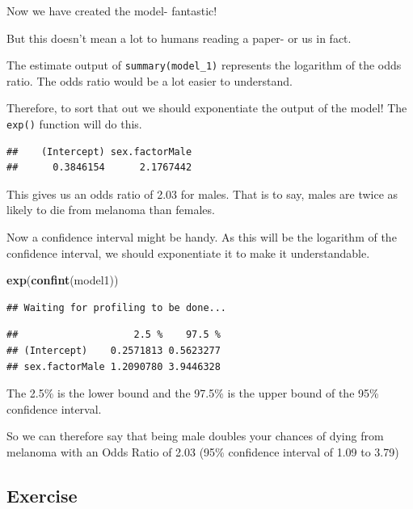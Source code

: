 \documentclass[]{book}
\makeatletter
\newenvironment{Shaded}{\begin{snugshade}}{\end{snugshade}}
\newcommand{\KeywordTok}[1]{\textcolor[rgb]{0.13,0.29,0.53}{\textbf{#1}}}
\newcommand{\OperatorTok}[1]{\textcolor[rgb]{0.81,0.36,0.00}{\textbf{#1}}}
\newcommand{\NormalTok}[1]{#1}
\newenvironment{kframe}{%
\medskip{}
\setlength{\fboxsep}{.8em}
 \def\at@end@of@kframe{}%
 \ifinner\ifhmode%
  \def\at@end@of@kframe{\end{minipage}}%
  \begin{minipage}{\columnwidth}%
 \fi\fi%
 \def\FrameCommand##1{\hskip\@totalleftmargin \hskip-\fboxsep
 \colorbox{shadecolor}{##1}\hskip-\fboxsep
     \hskip-\linewidth \hskip-\@totalleftmargin \hskip\columnwidth}%
 \MakeFramed {\advance\hsize-\width
   \@totalleftmargin\z@ \linewidth\hsize
   \@setminipage}}%
 {\par\unskip\endMakeFramed%
 \at@end@of@kframe}
\renewenvironment{Shaded}{\begin{kframe}}{\end{kframe}}
\makeatother
\begin{document}
Now we have created the model- fantastic!

But this doesn't mean a lot to humans reading a paper- or us in fact.

The estimate output of \texttt{summary(model\_1)} represents the
logarithm of the odds ratio. The odds ratio would be a lot easier to
understand.

Therefore, to sort that out we should exponentiate the output of the
model! The \texttt{exp()} function will do this.

\begin{Shaded}
\end{Shaded}

\begin{verbatim}
##    (Intercept) sex.factorMale 
##      0.3846154      2.1767442
\end{verbatim}

This gives us an odds ratio of 2.03 for males. That is to say, males are
twice as likely to die from melanoma than females.

Now a confidence interval might be handy. As this will be the logarithm
of the confidence interval, we should exponentiate it to make it
understandable.

\begin{Shaded}
\begin{Highlighting}[]
\KeywordTok{exp}\NormalTok{(}\KeywordTok{confint}\NormalTok{(model1))}
\end{Highlighting}
\end{Shaded}

\begin{verbatim}
## Waiting for profiling to be done...
\end{verbatim}

\begin{verbatim}
##                    2.5 %    97.5 %
## (Intercept)    0.2571813 0.5623277
## sex.factorMale 1.2090780 3.9446328
\end{verbatim}

The 2.5\% is the lower bound and the 97.5\% is the upper bound of the
95\% confidence interval.

So we can therefore say that being male doubles your chances of dying
from melanoma with an Odds Ratio of 2.03 (95\% confidence interval of
1.09 to 3.79)

\subsection{Exercise}\label{exercise-44}
\end{document}
